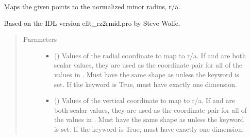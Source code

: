 \documentclass[letterpaper,10pt,english]{sphinxmanual}
\begin{document}
\begin{fulllineitems}
\begin{fulllineitems}
\begin{sphinxVerbatim}[commandchars=\\\{\}]
     
\end{sphinxVerbatim}

\end{fulllineitems}


\begin{fulllineitems}
\label{\detokenize{eqtools:eqtools.core.Equilibrium.rz2roa}}
Maps the given points to the normalized minor radius, r/a.

Based on the IDL version efit\_rz2rmid.pro by Steve Wolfe.
\begin{quote}\begin{description}
\item[{Parameters}] \leavevmode\begin{itemize}
\item {} 
 () \textendash{} Values of the radial coordinate to
map to r/a. If  and  are both scalar values,
they are used as the coordinate pair for all of the values in
. Must have the same shape as  unless the 
keyword is set. If the  keyword is True,  must
have exactly one dimension.

\item {} 
 () \textendash{} Values of the vertical coordinate to
map to r/a. If  and  are both scalar values,
they are used as the coordinate pair for all of the values in
. Must have the same shape as  unless the 
keyword is set. If the  keyword is True,  must
have exactly one dimension.


\end{itemize}
\end{description}
\end{quote}
\end{fulllineitems}
\end{fulllineitems}
\end{document}
